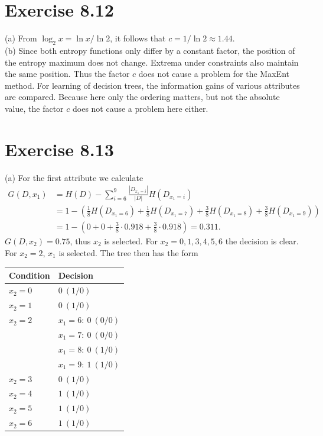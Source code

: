 \documentclass[10pt]{book}
\begin{document}
\section{Exercise 8.12}
(a) From $\log _{2} x=\ln x / \ln 2$, it follows that $c=1 / \ln 2 \approx 1.44$.\\
(b) Since both entropy functions only differ by a constant factor, the position of the entropy maximum does not change. Extrema under constraints also maintain the same position. Thus the factor $c$ does not cause a problem for the MaxEnt method. For learning of decision trees, the information gains of various attributes are compared. Because here only the ordering matters, but not the absolute value, the factor $c$ does not cause a problem here either.

\section{Exercise 8.13}
(a) For the first attribute we calculate
\[
\begin{aligned}
G\left(D, x_{1}\right) & =H(D)-\sum_{i=6}^{9} \frac{\left|D_{x_{1}=i}\right|}{|D|} H\left(D_{x_{1}=i}\right) \\
& =1-\left(\frac{1}{8} H\left(D_{x_{1}=6}\right)+\frac{1}{8} H\left(D_{x_{1}=7}\right)+\frac{3}{8} H\left(D_{x_{1}=8}\right)+\frac{3}{8} H\left(D_{x_{1}=9}\right)\right) \\
& =1-\left(0+0+\frac{3}{8} \cdot 0.918+\frac{3}{8} \cdot 0.918\right)=0.311.
\end{aligned}
\]
$G\left(D, x_{2}\right)=0.75$, thus $x_{2}$ is selected. For $x_{2}=0,1,3,4,5,6$ the decision is clear. For $x_{2}=2$, $x_{1}$ is selected. The tree then has the form
\begin{center}
\begin{tabular}{|l|l|}
\hline
Condition & Decision \\
\hline
$x_{2}=0$ & $0\ (1/0)$ \\
$x_{2}=1$ & $0\ (1/0)$ \\
$x_{2}=2$ & $x_{1}=6:\ 0\ (0/0)$ \\
          & $x_{1}=7:\ 0\ (0/0)$ \\
          & $x_{1}=8:\ 0\ (1/0)$ \\
          & $x_{1}=9:\ 1\ (1/0)$ \\
$x_{2}=3$ & $0\ (1/0)$ \\
$x_{2}=4$ & $1\ (1/0)$ \\
$x_{2}=5$ & $1\ (1/0)$ \\
$x_{2}=6$ & $1\ (1/0)$ \\
\hline
\end{tabular}
\end{center}
\end{document}
